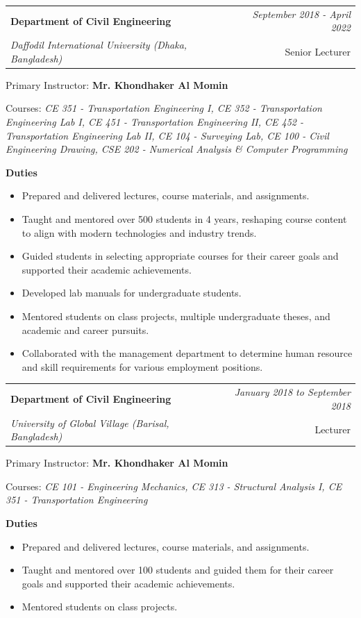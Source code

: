 \documentclass[a4paper,11pt]{article}
\makeatletter
\newcommand{\resumeSubheading}[4]{
\vspace{0.5mm}\item
    \begin{tabular*}{0.98\textwidth}[t]{l@{\extracolsep{\fill}}r}
        \textbf{#1} & \textit{\footnotesize{#4}} \\
        \textit{\footnotesize{#3}} &  \footnotesize{#2}\\
    \end{tabular*}
    \vspace{-2.4mm}
}
\newcommand{\resumeItemListStart}{\begin{itemize}[leftmargin=*,labelsep=1mm,itemsep=0.5mm]}
\newcommand{\resumeItemListEnd}{\end{itemize}\vspace{-2mm}}
\makeatother
\begin{document}
    
  \resumeSubheading
      {{Department of Civil Engineering}}{Senior Lecturer{}}
      {Daffodil International University (Dhaka, Bangladesh)}{September 2018 - April 2022}
      \vspace{2mm}
      \begin{justifying}
    \resumeItemListStart
        Primary Instructor: \textbf{Mr. Khondhaker Al Momin}
    \resumeItemListEnd
    
\noindent
    Courses: \textit{CE 351 - Transportation Engineering I, CE 352 - Transportation Engineering Lab I, CE 451 - Transportation Engineering II, CE 452 - Transportation Engineering Lab II, CE 104 - Surveying Lab, CE 100 - Civil Engineering Drawing, CSE 202 - Numerical Analysis \& Computer Programming}

\vspace{2mm}
\noindent
\textcolor{mycolor}{\textbf{Duties}}
    
      \resumeItemListStart
        \item Prepared and delivered lectures, course materials, and assignments.
        \item Taught and mentored over 500 students in 4 years, reshaping course content to align with modern technologies and industry trends.
        \item Guided students in selecting appropriate courses for their career goals and supported their academic achievements.
        \item Developed lab manuals for undergraduate students.
        \item Mentored students on class projects, multiple undergraduate theses, and academic and career pursuits.
        \item Collaborated with the management department to determine human resource and skill requirements for various employment positions.
    \resumeItemListEnd
    \end{justifying}


  \resumeSubheading
      {{Department of Civil Engineering}}{Lecturer{}}
      {University of Global Village (Barisal, Bangladesh)}{January 2018 to September 2018}
      \vspace{2mm}
      \begin{justifying}
    \resumeItemListStart
        Primary Instructor: \textbf{Mr. Khondhaker Al Momin}
    \resumeItemListEnd
    
\noindent
    Courses: \textit{CE 101 - Engineering Mechanics, CE 313 - Structural Analysis I, CE 351 - Transportation Engineering}


\noindent
\textcolor{mycolor}{\textbf{Duties}}
    
      \resumeItemListStart
        \item Prepared and delivered lectures, course materials, and assignments.
        \item Taught and mentored over 100 students and guided them for their career goals and supported their academic achievements.
        \item Mentored students on class projects.
    \resumeItemListEnd
    \end{justifying}
\end{document}
